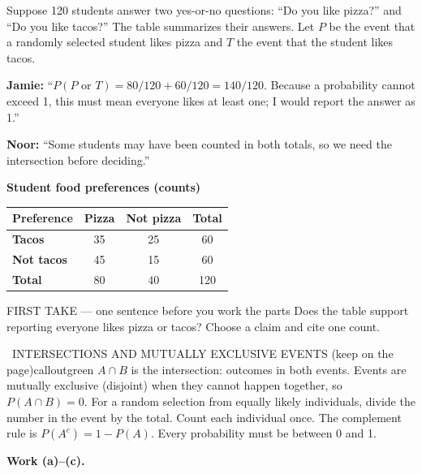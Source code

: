 \documentclass[11pt]{article}
\begin{document}


Suppose 120 students answer two yes-or-no questions: ``Do you like pizza?'' and ``Do you like tacos?'' The table summarizes their answers. Let $P$ be the event that a randomly selected student likes pizza and $T$ the event that the student likes tacos.\par\smallskip \textbf{Jamie:} ``$P(P\text{ or }T)=80/120+60/120=140/120$. Because a probability cannot exceed 1, this must mean everyone likes at least one; I would report the answer as 1.''\par \textbf{Noor:} ``Some students may have been counted in both totals, so we need the intersection before deciding.''\par
\begin{center}
\textbf{Student food preferences (counts)}\par\smallskip
\begin{tabular}{|l|c|c|c|}
\hline
\textbf{Preference} & \textbf{Pizza} & \textbf{Not pizza} & \textbf{Total} \\ \hline
\textbf{Tacos} & 35 & 25 & 60 \\ \hline
\textbf{Not tacos} & 45 & 15 & 60 \\ \hline
\textbf{Total} & 80 & 40 & 120 \\ \hline
\end{tabular}
\end{center}
\begin{firsttakebox}{FIRST TAKE --- one sentence before you work the parts}
Does the table support reporting everyone likes pizza or tacos? Choose a claim and cite one count.
\workspace{0.9in}
\end{firsttakebox}

\begin{callout}{\IconBook\ INTERSECTIONS AND MUTUALLY EXCLUSIVE EVENTS (keep on the page)}{calloutgreen}
$A\cap B$ is the intersection: outcomes in both events. Events are mutually exclusive (disjoint) when they cannot happen together, so $P(A\cap B)=0$. For a random selection from equally likely individuals, divide the number in the event by the total. Count each individual once. The complement rule is $P(A^c)=1-P(A)$. Every probability must be between 0 and 1.
\end{callout}

\newpage
\textbf{Work (a)--(c).}\par\smallskip
\end{document}
